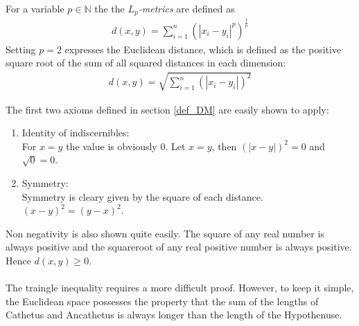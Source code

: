 For a variable $p \in \mathbb{N}$ the the $L_p$\textit{-metrics} are defined as
\begin{align} \label{lpmetric}
    d(x, y) = \sum_{i=1}^{n}(|x_i-y_i|^p)^\frac{1}{p}
\end{align}
Setting $p = 2$ expresses the Euclidean distance, which is defined as the positive square root of the sum of all squared distances in each dimension:
\begin{align}
    d(x, y) = \sqrt{\sum_{i = 1}^{n}(|x_i - y_i|)^2}
\end{align}

The first two axioms defined in section \ref{def_DM} are easily shown to apply:
\begin{enumerate}

\item Identity of indiscernibles:\\
For $x = y$ the value is obviously $0$. Let $x = y$, then $(|x - y|)^2 = 0$ and $\sqrt{0} = 0$.

\item Symmetry: \\
Symmetry is cleary given by the square of each distance.\\
$(x - y)^2 = (y - x)^2$.
\end{enumerate}

Non negativity is also shown quite easily. The square of any real number is always positive and the squareroot of any real positive number is always positive. Hence $d(x, y) \geq 0$.\\
\ \\
The traingle inequality requires a more difficult proof. However, to keep it simple, the Euclidean space possesses the property that the sum of the lengths of Cathetus and Ancathetus is always longer than the length of the Hypothenuse. \cite{MMDS}